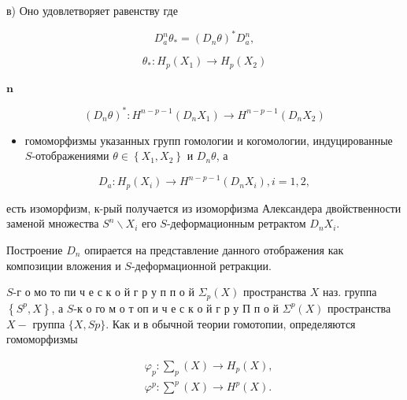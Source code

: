 \documentclass[10pt]{article}
\begin{document}
в) Оно удовлетворяет равенству где



\[

D_{a}^{n} \theta_{*}=\left(D_{n} \theta\right)^{*} D_{a}^{n},

\]



\[

\theta_{*}: H_{p}\left(X_{1}\right) \longrightarrow H_{p}\left(X_{2}\right)

\]



$\mathbf{n}$



\[

\left(D_{n} \theta\right)^{*}: H^{n-p-1}\left(D_{n} X_{1}\right) \longrightarrow H^{n-p-1}\left(D_{n} X_{2}\right)

\]



\begin{itemize}

  \item гомоморфизмы указанных групп гомологии и когомологии, индуцированные $S$-отображениями $\theta \in\left\{X_{1}, X_{2}\right\}$ и $D_{n} \theta$, а

\end{itemize}



\[

D_{a}: H_{p}\left(X_{i}\right) \rightarrow H^{n-p-1}\left(D_{n} X_{i}\right), i=1,2,

\]



есть изоморфизм, к-рый получается из изоморфизма Александера двойственности заменой множества $S^{n} \backslash X_{i}$ его $S$-деформационным ретрактом $D_{n} X_{i}$.



Построение $D_{n}$ опирается на представление данного отображения как композиции вложения и $S$-деформационной ретракции.



$S$-г о мо то пи ч е с к о й г р у п п о й $\Sigma_{p}(X)$ пространства $X$ наз. группа $\left\{S^{p}, X\right\}$, а $S$-к о го м о т оп и ч е с к о й г р у П п о й $\Sigma^{p}(X)$ пространства $X-$ группа $\{X, S p\}$. Как и в обычной теории гомотопии, определяются гомоморфизмы



\[

\begin{aligned}

& \varphi_{p}: \sum_{p}(X) \rightarrow H_{p}(X), \\

& \varphi^{p}: \sum^{p}(X) \rightarrow H^{p}(X) .

\end{aligned}

\]
\end{document}

